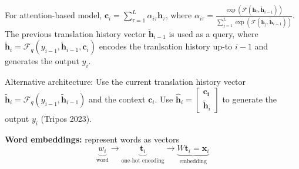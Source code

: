 \documentclass[12pt]{article}
\begin{document}
For attention-based model, $\boldsymbol{c}_i = \sum_{\tau=1}^{L} \alpha_{i\tau} \boldsymbol{h}_\tau$, where $\alpha_{i\tau} = \frac{\exp(\mathcal{F}(\boldsymbol{h}_\tau, \tilde{\boldsymbol{h}}_{i-1}))}{\sum_{j=1}^{L} \exp(\mathcal{F}(\boldsymbol{h}_j, \tilde{\boldsymbol{h}}_{i-1}))}$. The previous translation history vector $\tilde{\boldsymbol{h}}_{i-1}$ is used as a query, where $\tilde{\boldsymbol{h}}_{i} = \mathcal{F}_q(y_{i-1}, \tilde{\boldsymbol{h}}_{i-1}, \boldsymbol{c}_{i})$ encodes the tranlsation history up-to $i-1$ and generates the output $y_i$.

Alternative architecture: Use the current translation history vector $\tilde{\boldsymbol{h}}_i = \mathcal{F}_q(y_{i-1}, \tilde{\boldsymbol{h}}_{i-1})$ and the context $\boldsymbol{c}_i$. Use $\hat{\boldsymbol{h}}_i = \begin{bmatrix}\boldsymbol{c_i} \\ \tilde{\boldsymbol{h}}_i\end{bmatrix}$ to generate the output $y_i$ (Tripos 2023).

\textbf{Word embeddings:} represent words as vectors
$$
\underbrace{w_i}_{\text{word}} \to \underbrace{\boldsymbol{t}_i}_{\text{one-hot encoding}} \to \underbrace{W\boldsymbol{t}_i = \boldsymbol{x}_i}_{\text{embedding}}
$$
\end{document}
